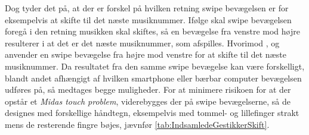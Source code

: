 Dog tyder det på, at der er forskel på hvilken retning swipe bevægelsen er for eksempelvis at skifte til det næste musiknummer. Ifølge \textcite[s. 166]{PDF:ComparingInputModalities} skal swipe bevægelsen foregå i den retning musikken skal skiftes, så en bevægelse fra venstre mod højre resulterer i at det er det næste musiknummer, som afspilles. Hvorimod \textcite[s. 48]{PDF:UserDefinedGesturesTV}, \textcite{WEB:Beosound2} og \textcite{WEB:BeosoundMoment} anvender en swipe bevægelse fra højre mod venstre for at skifte til det næste musiknummer. Da resultatet fra den samme swipe bevægelse kan være forskelligt, blandt andet afhængigt af hvilken smartphone eller bærbar computer bevægelsen udføres på, så medtages begge muligheder. For at minimere risikoen for at der opstår et \textit{Midas touch problem}, viderebygges der på swipe bevægelserne, så de designes med forskellige håndtegn, eksempelvis med tommel- og lillefinger strakt mens de resterende fingre bøjes, jævnfør \autoref{tab:IndsamledeGestikkerSkift}.

